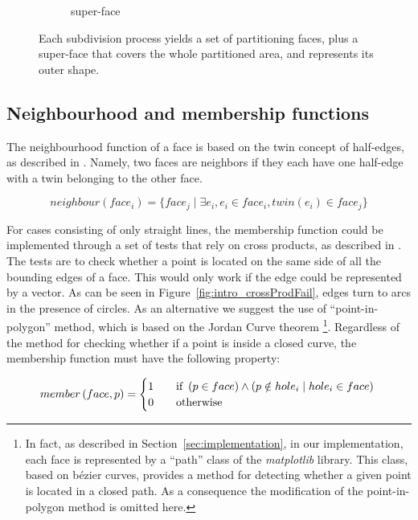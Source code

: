\begin{figure}
\begin{subfigure}{.32\textwidth}
    \caption{super-face} \label{subfig:subd_superface_c}
  \end{subfigure}%
  \caption[xxx]
          {Each subdivision process yields a set of partitioning faces, plus a super-face that covers the whole partitioned area, and represents its outer shape.}
  \label{fig:subd_superface}
\end{figure}

\subsection{Neighbourhood and membership functions} \label{subsec:memberNeighbour}

The neighbourhood function of a face is based on the twin concept of half-edges, as described in \cite{de2000computational}.
Namely, two faces are neighbors if they each have one half-edge with a twin belonging to the other face.

\[
neighbour\left(face_i\right) = \lbrace  face_j \mid \exists e_i, e_i \in face_i, \mathit{twin}(e_i) \in face_j \rbrace
\]

For cases consisting of only straight lines, the membership function could be implemented through a set of tests that rely on cross products, as described in \cite{de2000computational}.
The tests are to check whether a point is located on the same side of all the bounding edges of a face.
This would only work if the edge could be represented by a vector.
As can be seen in Figure~\ref{fig:intro_crossProdFail}, edges turn to arcs in the presence of circles.
As an alternative we suggest the use of ``point-in-polygon'' method, which is based on the Jordan Curve theorem \footnote{In fact, as described in Section~\ref{sec:implementation}, in our implementation, each face is represented by a ``path'' class of the \emph{matplotlib} library. This class, based on b\'ezier curves, provides a method for detecting whether a given point is located in a closed path. As a consequence the modification of the point-in-polygon method is omitted  here.}.
Regardless of the method for checking whether if a point is inside a closed curve, the membership function must have the following property:

\[
member\left(face,p\right) =
\begin{cases}
  1 & \quad \text{if } \left(p \in face\right) \land \left(p \notin hole_i \mid hole_i \in face\right) \\
  0 & \quad \text{otherwise} \\
\end{cases}\\
\]


